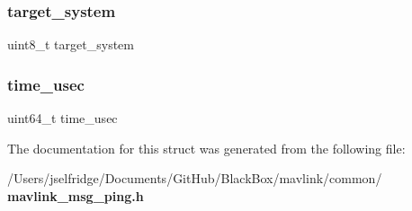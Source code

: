 \subsubsection{target\+\_\+system}
{\footnotesize\ttfamily uint8\+\_\+t target\+\_\+system}

\mbox{\label{struct____mavlink__ping__t_a2db60704c293664dcb6159b55c98c2f2}} 
\subsubsection{time\+\_\+usec}
{\footnotesize\ttfamily uint64\+\_\+t time\+\_\+usec}



The documentation for this struct was generated from the following file\+:\begin{DoxyCompactItemize}
\item 
/\+Users/jselfridge/\+Documents/\+Git\+Hub/\+Black\+Box/mavlink/common/\textbf{ mavlink\+\_\+msg\+\_\+ping.\+h}\end{DoxyCompactItemize}
